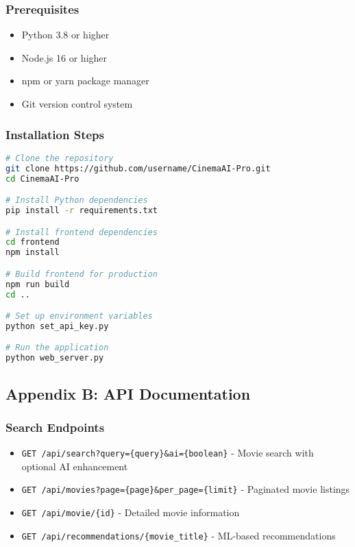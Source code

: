 \documentclass[12pt,a4paper]{article}
\begin{document}
\subsubsection{Prerequisites}
\begin{itemize}
    \item Python 3.8 or higher
    \item Node.js 16 or higher
    \item npm or yarn package manager
    \item Git version control system
\end{itemize}

\subsubsection{Installation Steps}
\begin{lstlisting}[language=bash, caption=Installation Commands]
# Clone the repository
git clone https://github.com/username/CinemaAI-Pro.git
cd CinemaAI-Pro

# Install Python dependencies
pip install -r requirements.txt

# Install frontend dependencies
cd frontend
npm install

# Build frontend for production
npm run build
cd ..

# Set up environment variables
python set_api_key.py

# Run the application
python web_server.py
\end{lstlisting}

\subsection{Appendix B: API Documentation}

\subsubsection{Search Endpoints}
\begin{itemize}
    \item \texttt{GET /api/search?query=\{query\}\&ai=\{boolean\}} - Movie search with optional AI enhancement
    \item \texttt{GET /api/movies?page=\{page\}\&per\_page=\{limit\}} - Paginated movie listings
    \item \texttt{GET /api/movie/\{id\}} - Detailed movie information
    \item \texttt{GET /api/recommendations/\{movie\_title\}} - ML-based recommendations
\end{itemize}
\end{document}
